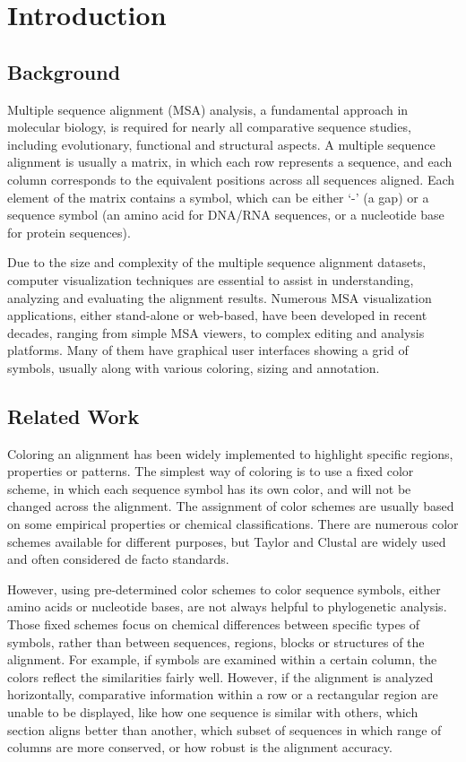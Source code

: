 \chapter{Introduction}\label{chap:Introduction}

\section{Background}

Multiple sequence alignment (MSA) analysis, a fundamental approach in molecular biology, is required for nearly all comparative sequence studies, including evolutionary, functional and structural aspects. A multiple sequence alignment is usually a matrix, in which each row represents a sequence, and each column corresponds to the equivalent positions across all sequences aligned. Each element of the matrix contains a symbol, which can be either `-' (a gap) or a sequence symbol (an amino acid for DNA/RNA sequences, or a nucleotide base for protein sequences). \cite{Edgar:2006aa}

Due to the size and complexity of the multiple sequence alignment datasets, computer visualization techniques are essential to assist in understanding, analyzing and evaluating the alignment results. Numerous MSA visualization applications, either stand-alone or web-based, have been developed in recent decades, ranging from simple MSA viewers, to complex editing and analysis platforms. Many of them have graphical user interfaces showing a grid of symbols, usually along with various coloring, sizing and annotation. \cite{Procter2010aa}

\section{Related Work}

Coloring an alignment has been widely implemented to highlight specific regions, properties or patterns. \cite{Procter2010aa} The simplest way of coloring is to use a fixed color scheme, in which each sequence symbol has its own color, and will not be changed across the alignment. The assignment of color schemes are usually based on some empirical properties or chemical classifications. There are numerous color schemes available for different purposes, but Taylor \cite{LIN2002361} and Clustal \cite{Thompsonaa} are widely used and often considered de facto standards.

However, using pre-determined color schemes to color sequence symbols, either amino acids or nucleotide bases, are not always helpful to phylogenetic analysis. Those fixed schemes focus on chemical differences between specific types of symbols, rather than between sequences, regions, blocks or structures of the alignment. For example, if symbols are examined within a certain column, the colors reflect the similarities fairly well. However, if the alignment is analyzed horizontally, comparative information within a row or a rectangular region are unable to be displayed, like how one sequence is similar with others, which section aligns better than another, which subset of sequences in which range of columns are more conserved, or how robust is the alignment accuracy.

